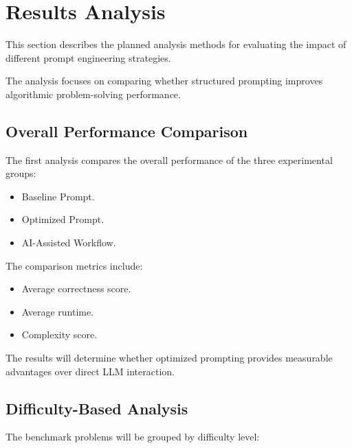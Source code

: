 \section{Results Analysis}


This section describes the planned analysis methods for evaluating the impact of
different prompt engineering strategies.


The analysis focuses on comparing whether structured prompting improves
algorithmic problem-solving performance.



\subsection{Overall Performance Comparison}


The first analysis compares the overall performance of the three experimental
groups:


\begin{itemize}

\item Baseline Prompt.

\item Optimized Prompt.

\item AI-Assisted Workflow.

\end{itemize}


The comparison metrics include:


\begin{itemize}

\item Average correctness score.

\item Average runtime.

\item Complexity score.

\end{itemize}



The results will determine whether optimized prompting provides measurable
advantages over direct LLM interaction.



\subsection{Difficulty-Based Analysis}


The benchmark problems will be grouped by difficulty level:


